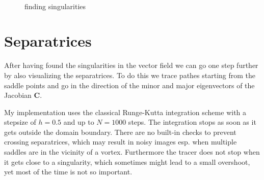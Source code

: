 \documentclass[a4paper,10pt,notitlepage]{scrreprt}
\newcommand{\mat}[1]{\mathbf{#1}}
\begin{document}
\begin{figure}
  \centering
  \\
  \caption{finding singularities}
  \label{fig:singularities}
\end{figure}

\chapter{Separatrices}

After having found the singularities in the vector field we can go one step
further by also visualizing the separatrices. To do this we trace pathes
starting from the saddle points and go in the direction of the minor and
major eigenvectors of the Jacobian $\mat{C}$.

My implementation uses the classical Runge-Kutta integration scheme with a
stepsize of $h = 0.5$ and up to $N = 1000$ steps. The integration stops as soon
as it gets outside the domain boundary. There are no built-in checks to prevent
crossing separatrices, which may result in noisy images esp. when multiple
saddles are in the vicinity of a vortex. Furthermore the tracer does not stop
when it gets close to a singularity, which sometimes might lead to a small
overshoot, yet most of the time is not so important.
\end{document}
